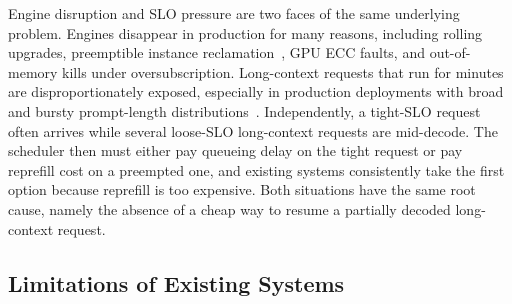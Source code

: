 
Engine disruption and SLO pressure are two faces of the same underlying problem. Engines disappear in production for many reasons, including rolling upgrades, preemptible instance reclamation~\cite{spotserve}, GPU ECC faults, and out-of-memory kills under oversubscription. Long-context requests that run for minutes are disproportionately exposed, especially in production deployments with broad and bursty prompt-length distributions~\cite{servegen}. Independently, a tight-SLO request often arrives while several loose-SLO long-context requests are mid-decode. The scheduler then must either pay queueing delay on the tight request or pay reprefill cost on a preempted one, and existing systems consistently take the first option because reprefill is too expensive. Both situations have the same root cause, namely the absence of a cheap way to resume a partially decoded long-context request.

\subsection{Limitations of Existing Systems}


